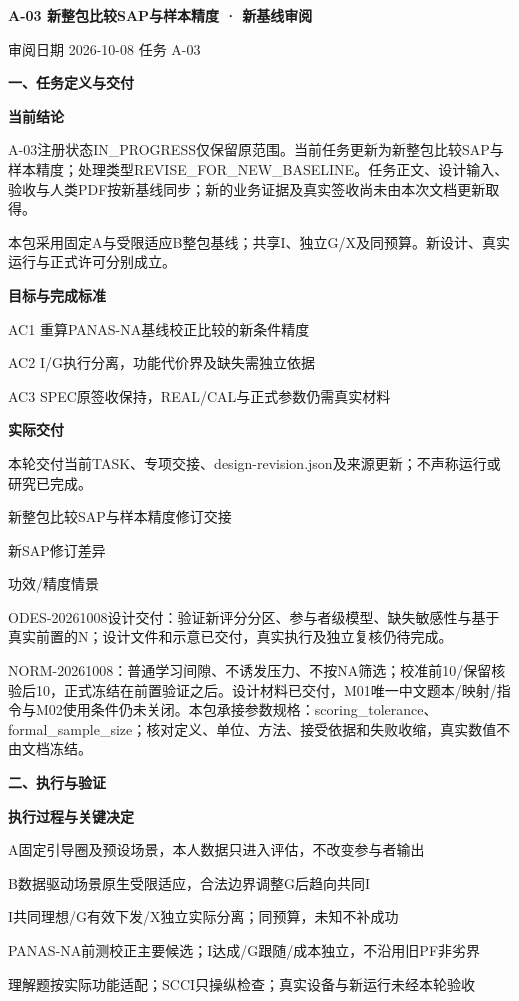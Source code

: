 \documentclass[11pt,a4paper]{article}
\newcommand{\reviewtitle}[1]{\begin{center}{\titlelatin\titlecjk\bfseries\fontsize{21}{28}\selectfont #1}\end{center}\vspace{8pt}}
\newcommand{\reviewsection}[1]{\par\Needspace{5\baselineskip}\vspace{10pt}\begin{center}{\titlelatin\titlecjk\bfseries\fontsize{14}{20}\selectfont #1}\end{center}}
\newcommand{\reviewsubsection}[1]{\par\Needspace{4\baselineskip}\vspace{4pt}\begin{center}{\titlelatin\titlecjk\bfseries\fontsize{12}{18}\selectfont #1}\end{center}}
\begin{document}
\reviewtitle{A-\allowbreak{}03 新整包比较SAP与样本精度 · 新基线审阅}
审阅日期 2026-\allowbreak{}10-\allowbreak{}08    任务 A-\allowbreak{}03


\reviewsection{一、任务定义与交付}
\reviewsubsection{1.1 当前结论}
A-\allowbreak{}03注册状态IN\_\allowbreak{}PROGRESS仅保留原范围。当前任务更新为新整包比较SAP与样本精度；处理类型REVISE\_\allowbreak{}FOR\_\allowbreak{}NEW\_\allowbreak{}BASELINE。任务正文、设计输入、验收与人类PDF按新基线同步；新的业务证据及真实签收尚未由本次文档更新取得。


本包采用固定A与受限适应B整包基线；共享I、独立G/\allowbreak{}X及同预算。新设计、真实运行与正式许可分别成立。


\reviewsubsection{1.2 目标与完成标准}
AC1 重算PANAS-\allowbreak{}NA基线校正比较的新条件精度


AC2 I/\allowbreak{}G执行分离，功能代价界及缺失需独立依据


AC3 SPEC原签收保持，REAL/\allowbreak{}CAL与正式参数仍需真实材料


\reviewsubsection{1.3 实际交付}
本轮交付当前TASK、专项交接、design-\allowbreak{}revision.json及来源更新；不声称运行或研究已完成。


新整包比较SAP与样本精度修订交接


新SAP修订差异


功效/\allowbreak{}精度情景


ODES-\allowbreak{}20261008设计交付：验证新评分分区、参与者级模型、缺失敏感性与基于真实前置的N；设计文件和示意已交付，真实执行及独立复核仍待完成。


NORM-\allowbreak{}20261008：普通学习间隙、不诱发压力、不按NA筛选；校准前10/\allowbreak{}保留核验后10，正式冻结在前置验证之后。设计材料已交付，M01唯一中文题本/\allowbreak{}映射/\allowbreak{}指令与M02使用条件仍未关闭。本包承接参数规格：scoring\_\allowbreak{}tolerance、formal\_\allowbreak{}sample\_\allowbreak{}size；核对定义、单位、方法、接受依据和失败收缩，真实数值不由文档冻结。


\reviewsection{二、执行与验证}
\reviewsubsection{2.1 执行过程与关键决定}
A固定引导圈及预设场景，本人数据只进入评估，不改变参与者输出


B数据驱动场景原生受限适应，合法边界调整G后趋向共同I


I共同理想/\allowbreak{}G有效下发/\allowbreak{}X独立实际分离；同预算，未知不补成功


PANAS-\allowbreak{}NA前测校正主要候选；I达成/\allowbreak{}G跟随/\allowbreak{}成本独立，不沿用旧PF非劣界


理解题按实际功能适配；SCCI只操纵检查；真实设备与新运行未经本轮验收
\end{document}
